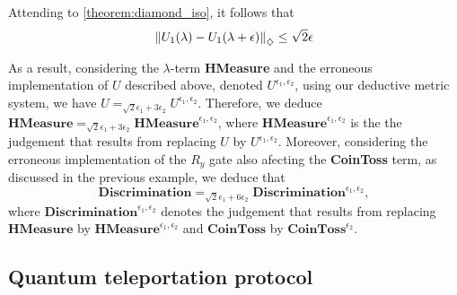 \begin{example}
Attending to \autoref{theorem:diamond_iso}, it follows that
  \begin{align*}
    \left\lVert U_1(\lambda)- U_1(\lambda + \epsilon)  \right\rVert_{\diamondsuit} \leq \sqrt{2} \epsilon
  \end{align*}

  


As a result, considering the $\lambda$-term \textbf{HMeasure} and the erroneous implementation of $U$ described above, denoted $U^{\epsilon_1, \epsilon_2}$, using our deductive metric system, we have $U =_{\sqrt{2}\epsilon_1+ 3\epsilon_2} U^{\epsilon_1, \epsilon_2}$. Therefore, we deduce $\textbf{HMeasure} =_{\sqrt{2}\epsilon_1+ 3\epsilon_2} \textbf{HMeasure}^{\epsilon_1, \epsilon_2}$, where $\textbf{HMeasure}^{\epsilon_1, \epsilon_2}$ is the the judgement that results from replacing $U$ by $U^{\epsilon_1, \epsilon_2}$. Moreover, considering the erroneous implementation of the $R_y$ gate also afecting the \textbf{CoinToss} term, as discussed in the previous example, we deduce that 
$$\textbf{Discrimination} =_{\sqrt{2}\epsilon_1+6\epsilon_2} \textbf{Discrimination}^{\epsilon_1,\epsilon_2}, $$
where $\textbf{Discrimination}^{\epsilon_1,\epsilon_2}$ denotes the judgement that results from replacing $\textbf{HMeasure}$ by $\textbf{HMeasure}^{\epsilon_1, \epsilon_2}$ and $\textbf{CoinToss}$ by  $\textbf{CoinToss}^{\epsilon_2}$.

\end{example}

\subsection{Quantum teleportation protocol}



